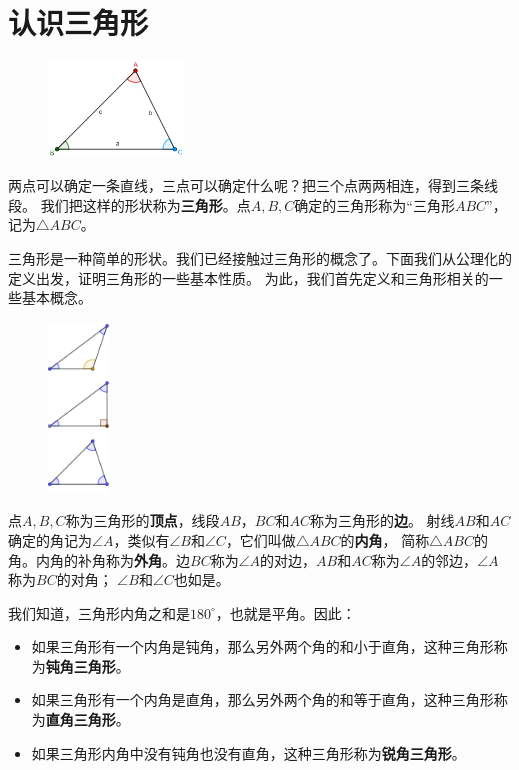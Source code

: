 \documentclass[12pt,UTF8]{ctexbook}
\begin{document}
\section{认识三角形}
\begin{figure} %
    \vspace{-35pt}
    \includegraphics[width=0.32\textwidth]{三角形0.png}
\end{figure}
两点可以确定一条直线，三点可以确定什么呢？把三个点两两相连，得到三条线段。
我们把这样的形状称为\textbf{三角形}。点$A,B,C$确定的三角形称为“三角形$ABC$”，记为$\triangle ABC$。

三角形是一种简单的形状。我们已经接触过三角形的概念了。下面我们从公理化的定义出发，证明三角形的一些基本性质。
为此，我们首先定义和三角形相关的一些基本概念。 

\begin{figure} %
    \vspace{-10pt}
    \includegraphics[width=0.144\textwidth]{三角形1.png}
\end{figure}

点$A,B,C$称为三角形的\textbf{顶点}，线段$AB$，$BC$和$AC$称为三角形的\textbf{边}。
射线$AB$和$AC$确定的角记为$\angle A$，类似有$\angle B$和$\angle C$，它们叫做$\triangle ABC$的\textbf{内角}，
简称$\triangle ABC$的角。内角的补角称为\textbf{外角}。边$BC$称为$\angle A$的对边，$AB$和$AC$称为$\angle A$的邻边，$\angle A$称为$BC$的对角；
$\angle B$和$\angle C$也如是。

我们知道，三角形内角之和是$180^\circ$，也就是平角。因此：
\begin{itemize}
    \item 如果三角形有一个内角是钝角，那么另外两个角的和小于直角，这种三角形称为\textbf{钝角三角形}。
    \item 如果三角形有一个内角是直角，那么另外两个角的和等于直角，这种三角形称为\textbf{直角三角形}。
    \item 如果三角形内角中没有钝角也没有直角，这种三角形称为\textbf{锐角三角形}。
\end{itemize}
\end{document}
